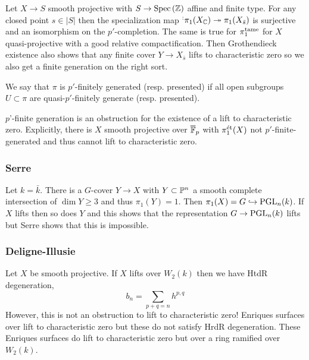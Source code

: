 \documentclass[12pt]{article}
\begin{document}
\begin{example}
Let $X \to S$ smooth projective with $S \to \Spec{\Z}$ affine and finite type. For any closed point $s \in |S|$ then the specialization map $\sp : \pi_1(X_{\CC}) \onto \pi_1(X_{\bar{s}})$ is surjective and an isomorphism on the $p'$-completion. The same is true for $\pi_1^{\tame}$ for $X$ quasi-projective with a good relative compactification. Then Grothendieck existence also shows that any finite \etale cover $Y \to X_{\bar{s}}$ lifts to characteristic zero so we also get a finite generation on the right sort. 
\end{example}

\begin{defn}
We say that $\pi$ is $p'$-finitely generated (resp. presented) if all open subgroups $U \subset \pi$ are quasi-$p'$-finitely generate (resp. presented).
\end{defn}

\begin{theorem}
$p$'-finite generation is an obstruction for the existence of a lift to characteristic zero. Explicitly, there is $X$ smooth projective over $\overline{\FF}_p$ with $\pi_1^{\et}(X)$ not $p'$-finite-generated and thus cannot lift to characteristic zero.
\end{theorem}

\subsubsection{Serre}

Let $k = \bar{k}$. There is a $G$-cover $Y \to X$ with $Y \subset \P^n$ a smooth complete intersection of $\dim{Y} \ge 3$ and thus $\pi_1(Y) = 1$. Then $\pi_1(X) = G \embed \PGL_n(k)$. If $X$ lifts then so does $Y$ and this shows that the representation $G \to \PGL_n(k)$ lifts but Serre shows that this is impossible. 

\subsubsection{Deligne-Illusie}

Let $X$ be smooth projective. If $X$ lifts over $W_2(k)$ then we have HtdR degeneration,
\[ b_n = \sum_{p + q = n} h^{p,q} \]
However, this is not an obstruction to lift to characteristic zero! Enriques surfaces over lift to characteristic zero but these do not satisfy HrdR degeneration. These Enriques surfaces do lift to characteristic zero but over a ring ramified over $W_2(k)$.
\end{document}
